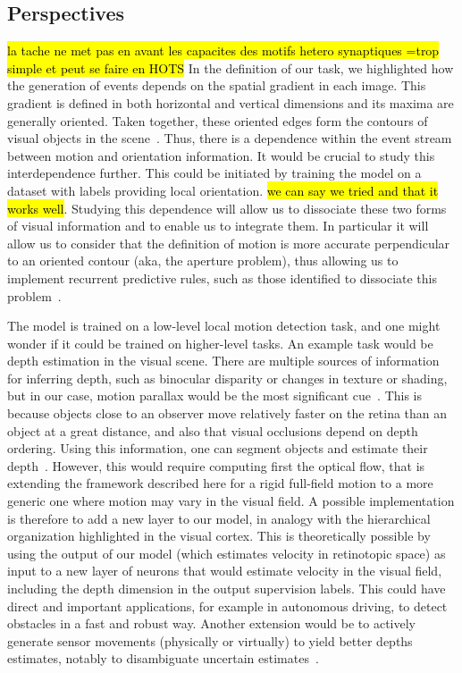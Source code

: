 \documentclass[default]{sn-jnl}%
\theoremstyle{thmstyleone}%
\theoremstyle{thmstyletwo}%
\theoremstyle{thmstylethree}%
\newcommand{\note}[1]{{\sethlcolor{yellow}\hl{#1}}}
\begin{document}
\subsection{Perspectives}
\note{la tache ne met pas en avant les capacites des motifs hetero synaptiques =trop simple et peut se faire en HOTS}
In the definition of our task, we highlighted how the generation of events depends on the spatial gradient in each image. This gradient is defined in both horizontal and vertical dimensions and its maxima are generally oriented. Taken together, these oriented edges form the contours of visual objects in the scene~\citep{koenderink_representation_1987}. Thus, there is a dependence within the event stream between motion and orientation information. It would be crucial to study this interdependence further. This could be initiated by training the model on a dataset with labels providing local orientation. \note{we can say we tried and that it works well}. Studying this dependence will allow us to dissociate these two forms of visual information and to enable us to integrate them. In particular it will allow us to consider that the definition of motion is more accurate perpendicular to an oriented contour (aka, the aperture problem), thus allowing us to implement recurrent predictive rules, such as those identified to dissociate this problem~\citep{perrinet_motion-based_2012}.

The model is trained on a low-level local motion detection task, and one might wonder if it could be trained on higher-level tasks. An example task would be depth estimation in the visual scene. There are multiple sources of information for inferring depth, such as binocular disparity or changes in texture or shading, but in our case, motion parallax would be the most significant cue~\citep{rogers_motion_1979}. This is because objects close to an observer move relatively faster on the retina than an object at a great distance, and also that visual occlusions depend on depth ordering. Using this information, one can segment objects and estimate their depth~\citep{yoonessi_contribution_2011}. However, this would require computing first the optical flow, that is extending the framework described here for a rigid full-field motion to a more generic one where motion may vary in the visual field. A possible implementation is therefore to add a new layer to our model, in analogy with the hierarchical organization highlighted in the visual cortex. This is theoretically possible by using the output of our model (which estimates velocity in retinotopic space) as input to a new layer of neurons that would estimate velocity in the visual field, including the depth dimension in the output supervision labels. This could have direct and important applications, for example in autonomous driving, to detect obstacles in a fast and robust way. Another extension would be to actively generate sensor movements (physically or virtually) to yield better depths estimates, notably to disambiguate uncertain estimates~\citep{nawrot_eye_2003}.
\end{document}
